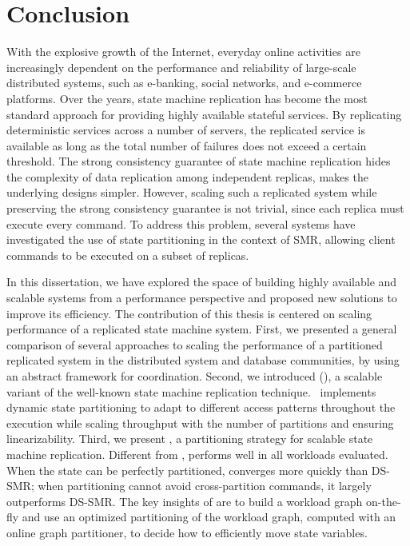 \chapter[Conclusion]{Conclusion}

With the explosive growth of the Internet, everyday online activities are
increasingly dependent on the performance and reliability of large-scale
distributed systems, such as e-banking, social networks, and e-commerce
platforms. Over the years, state machine replication has become the most
standard approach for providing highly available stateful services. By
replicating deterministic services across a number of servers, the replicated
service is available as long as the total number of failures does not exceed a
certain threshold. The strong consistency guarantee of state machine replication
hides the complexity of data replication among independent replicas, makes the
underlying designs simpler. However, scaling such a replicated system while
preserving the strong consistency guarantee is not trivial, since each replica
must execute every command. To address this problem, several systems have
investigated the use of state partitioning in the context of SMR, allowing
client commands to be executed on a subset of replicas. 

In this dissertation, we have explored the space of building highly available
and scalable systems from a performance perspective and proposed new solutions
to improve its efficiency. The contribution of this thesis is centered on
scaling performance of a replicated state machine system. First, we presented a
general comparison of several approaches to scaling the performance of a
partitioned replicated system in the distributed system and database
communities, by using an abstract framework for coordination. Second, we
introduced \dssmrlong{} (\dssmr), a scalable variant of the well-known state
machine replication technique. \dssmr\ implements dynamic state partitioning to
adapt to different access patterns throughout the execution while scaling
throughput with the number of partitions and ensuring linearizability. Third, we
present \dynastar, a partitioning strategy for scalable state machine
replication. Different from \dssmr{}, \dynastar performs well in all workloads
evaluated. When the state can be perfectly partitioned, \dynastar converges more
quickly than DS-SMR; when partitioning cannot avoid cross-partition commands, it
largely outperforms DS-SMR. The key insights of \dynastar are to build a
workload graph on-the-fly and use an optimized partitioning of the workload
graph, computed with an online graph partitioner, to decide how to efficiently
move state variables. 

